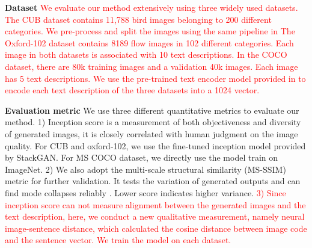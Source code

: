 \documentclass[10pt,twocolumn,letterpaper]{article}
\begin{document}
\textbf{Dataset} 
\textcolor{red}{We evaluate our method extensively using three widely used datasets. The CUB dataset \cite{welinder2010caltech} contains 11,788 bird images belonging to 200 different categories. We pre-process and split the images using the same pipeline in \cite{reed2016generative,han2017stackgan}
The Oxford-102 dataset \cite{Nilsback08} contains 8189 flow images in 102 different categories. 
Each image in both datasets is associated with 10 text descriptions. \textcolor{red}{In the COCO dataset, \cite{lin2014microsoft} there are 80k training images and a validation 40k images.  Each image has 5 text descriptions.  }
We use the pre-trained text encoder model provided in \cite{reed2016generative} to encode each text description of the three datasets into a 1024 vector.
}


\textbf{Evaluation metric}
We use three different quantitative metrics to evaluate our method.
1) Inception score \cite{improvedGAN} is a measurement of both objectiveness and diversity of generated images, it is closely correlated with human judgment on the image quality. For CUB and oxford-102, we use the fine-tuned inception model provided by StackGAN. For MS COCO dataset, we directly use the model train on ImageNet.
2) We also adopt the multi-scale structural similarity (MS-SSIM) metric \cite{improvedGAN} for further validation. It tests the variation of generated outputs and can find mode collapses reliably \cite{odena2016conditional}. Lower score indicates higher variance.
\textcolor{red}{3) Since inception score can not measure alignment between the generated images and the text description, here, we conduct a new qualitative measurement, namely neural image-sentence distance, which calculated the cosine distance between image code and the sentence vector. We train the model on each dataset. }
\end{document}

